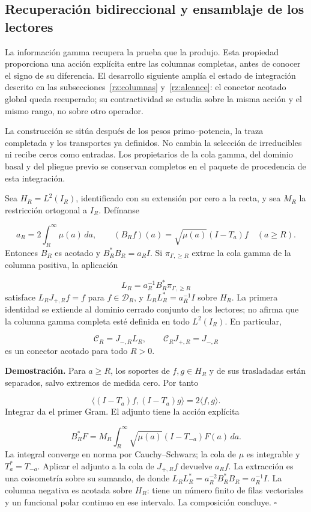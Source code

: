 \subsection{Recuperación bidireccional y ensamblaje de los lectores}
\label{rz:gamma}
La información gamma recupera la prueba que la produjo. Esta propiedad proporciona una acción explícita entre las columnas completas, antes de conocer el signo de su diferencia. El desarrollo siguiente amplía el estado de integración descrito en las subsecciones~\ref{rz:columnas} y~\ref{rz:alcance}: el conector acotado global queda recuperado; su contractividad se estudia sobre la misma acción y el mismo rango, no sobre otro operador.

La construcción se sitúa después de los pesos primo–potencia, la traza completada y los transportes ya definidos. No cambia la selección de irreducibles ni recibe ceros como entradas. Los propietarios de la cola gamma, del dominio basal y del pliegue previo se conservan completos en el paquete de procedencia de esta integración.

Sea \(H_R=L^2(I_R)\), identificado con su extensión por cero a la recta, y sea \(M_R\) la restricción ortogonal a \(I_R\). Defínanse

\[
a_R=2\int_R^\infty\mu(a)\,da,\qquad
(B_Rf)(a)=\sqrt{\mu(a)}(I-T_a)f\quad(a\geq R).
\]
Entonces \(B_R\) es acotado y \(B_R^*B_R=a_RI\). Si \(\pi_{\Gamma,\geq R}\) extrae la cola gamma de la columna positiva, la aplicación

\[
L_R=a_R^{-1}B_R^*\pi_{\Gamma,\geq R}
\]
satisface \(L_RJ_{+,R}f=f\) para \(f\in\mathcal D_R\), y \(L_RL_R^*=a_R^{-1}I\) sobre \(H_R\). La primera identidad se extiende al dominio cerrado conjunto de los lectores; no afirma que la columna gamma completa esté definida en todo \(L^2(I_R)\). En particular,

\[
\mathcal C_R=J_{-,R}L_R,\qquad
\mathcal C_RJ_{+,R}=J_{-,R}
\]
es un conector acotado para todo \(R>0\).

\textbf{Demostración.} Para \(a\geq R\), los soportes de \(f,g\in H_R\) y de sus trasladadas están separados, salvo extremos de medida cero. Por tanto

\[
\langle(I-T_a)f,(I-T_a)g\rangle=2\langle f,g\rangle.
\]
Integrar da el primer Gram. El adjunto tiene la acción explícita

\[
B_R^*F=M_R\int_R^\infty\sqrt{\mu(a)}(I-T_{-a})F(a)\,da.
\]
La integral converge en norma por Cauchy–Schwarz; la cola de \(\mu\) es integrable y \(T_a^*=T_{-a}\). Aplicar el adjunto a la cola de \(J_{+,R}f\) devuelve \(a_Rf\). La extracción es una coisometría sobre su sumando, de donde \(L_RL_R^*=a_R^{-2}B_R^*B_R=a_R^{-1}I\). La columna negativa es acotada sobre \(H_R\): tiene un número finito de filas vectoriales y un funcional polar continuo en ese intervalo. La composición concluye. \hfill\(\square\)

